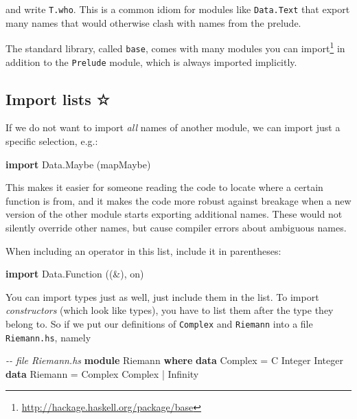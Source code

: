 \documentclass[11pt,
  american,
  DIV13]{article}
\newenvironment{Shaded}{}{}
\newcommand{\CommentTok}[1]{\textcolor[rgb]{0.38,0.63,0.69}{\textit{#1}}}
\newcommand{\DataTypeTok}[1]{\textcolor[rgb]{0.56,0.13,0.00}{#1}}
\newcommand{\KeywordTok}[1]{\textcolor[rgb]{0.00,0.44,0.13}{\textbf{#1}}}
\newcommand{\NormalTok}[1]{#1}
\newcommand{\OperatorTok}[1]{\textcolor[rgb]{0.40,0.40,0.40}{#1}}
\newcommand{\OtherTok}[1]{\textcolor[rgb]{0.00,0.44,0.13}{#1}}
\DeclareRobustCommand{\href}[2]{#2\footnote{\url{#1}}}
\begin{document}
and write \texttt{T.who}. This is a common idiom for modules like
\texttt{Data.Text} that export many names that would otherwise clash
with names from the prelude.

The standard library, called \texttt{base}, comes with
\href{http://hackage.haskell.org/package/base}{many modules you can
import} in addition to the \texttt{Prelude} module, which is always
imported implicitly.

\hypertarget{import-lists}{%
\subsection{Import lists ☆}\label{import-lists}}

If we do not want to import \emph{all} names of another module, we can
import just a specific selection, e.g.:

\begin{Shaded}
\begin{Highlighting}[]
\KeywordTok{import} \DataTypeTok{Data.Maybe}\NormalTok{ (mapMaybe)}
\end{Highlighting}
\end{Shaded}

This makes it easier for someone reading the code to locate where a
certain function is from, and it makes the code more robust against
breakage when a new version of the other module starts exporting
additional names. These would not silently override other names, but
cause compiler errors about ambiguous names.

When including an operator in this list, include it in parentheses:

\begin{Shaded}
\begin{Highlighting}[]
\KeywordTok{import} \DataTypeTok{Data.Function}\NormalTok{ ((\&), on)}
\end{Highlighting}
\end{Shaded}

You can import types just as well, just include them in the list. To
import \emph{constructors} (which look like types), you have to list
them after the type they belong to. So if we put our definitions of
\texttt{Complex} and \texttt{Riemann} into a file \texttt{Riemann.hs},
namely

\begin{Shaded}
\begin{Highlighting}[]
\CommentTok{{-}{-} file Riemann.hs}
\KeywordTok{module} \DataTypeTok{Riemann} \KeywordTok{where}
\KeywordTok{data} \DataTypeTok{Complex} \OtherTok{=} \DataTypeTok{C} \DataTypeTok{Integer} \DataTypeTok{Integer}
\KeywordTok{data} \DataTypeTok{Riemann} \OtherTok{=} \DataTypeTok{Complex} \DataTypeTok{Complex} \OperatorTok{|} \DataTypeTok{Infinity}
\end{Highlighting}
\end{Shaded}
\end{document}
